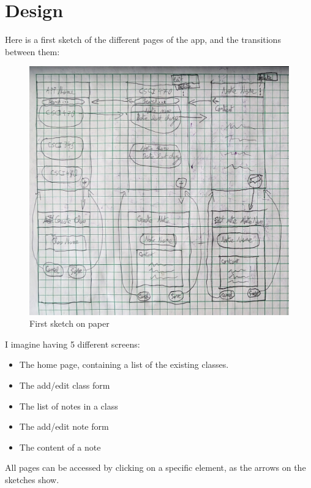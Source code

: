 \documentclass[]{article}
\begin{document}
	\pagebreak
	
	\section{Design}
	
	Here is a first sketch of the different pages of the app, and the transitions between them:
	
	\begin{figure}[!htb]
		\centering
		\includegraphics[scale=0.1]{first_sketch}
		\caption{First sketch on paper}
	\end{figure}
	
	I imagine having 5 different screens:
	
	\begin{itemize}
		\item The home page, containing a list of the existing classes.
		\item The add/edit class form
		\item The list of notes in a class
		\item The add/edit note form
		\item The content of a note
	\end{itemize}
	
	All pages can be accessed by clicking on a specific element, as the arrows on the sketches show.
	
\end{document}

